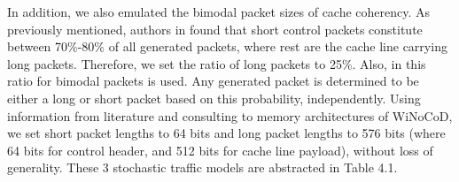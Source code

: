 In addition, we also emulated the bimodal packet sizes of cache coherency. As previously mentioned, authors in \cite{pantuning} found that short control packets constitute between 70\%-80\% of all generated packets, where rest are the cache line carrying long packets. Therefore, we set the ratio of long packets to 25\%. Also, in \cite{kurian2010atac} this ratio for bimodal packets is used. Any generated packet is determined to be either a long or short packet based on this probability, independently. Using information from literature and consulting to memory architectures of WiNoCoD, we set short packet lengths to 64 bits and long packet lengths to 576 bits (where 64 bits for control header, and 512 bits for cache line payload), without loss of generality. These 3 stochastic traffic models are abstracted in Table 4.1.   
 
